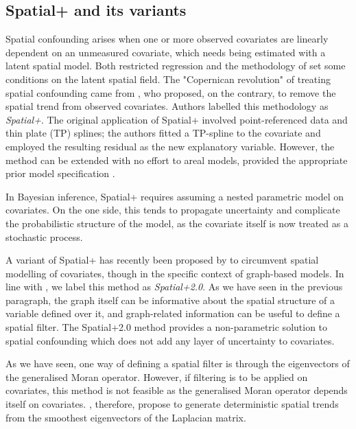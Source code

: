 \documentclass[openany, 11pt, oneside]{book}
\begin{document}




\subsection{Spatial+ and its variants} \label{subsection:Spatial+}

Spatial confounding arises when one or more observed covariates are linearly dependent on an unmeasured covariate, which needs being estimated with a latent spatial model. Both restricted regression and the methodology of \cite{HughesHaran} set some conditions on the latent spatial field. The "Copernican revolution" of treating spatial confounding came from \cite{Dupont}, who proposed, on the contrary, to remove the spatial trend from observed covariates. Authors labelled this methodology as \textit{Spatial+}. The original application of Spatial+ involved point-referenced data and thin plate (TP) splines; the authors fitted a TP-spline to the covariate and employed the resulting residual as the new explanatory variable. However, the method can be extended with no effort to areal models, provided the appropriate prior model specification \parencite{BayesianSpatial+}. 

In Bayesian inference, Spatial+ requires assuming a nested parametric model on covariates. On the one side, this tends to propagate uncertainty \parencite{BayesianSpatial+} and complicate the probabilistic structure of the model, as the covariate itself is now treated as a stochastic process. 

A variant of Spatial+ has recently been proposed by \cite{Urdangarin24} to circumvent spatial modelling of covariates, though in the specific context of graph-based models. In line with \parencite{Lamouroux}, we label this method as \textit{Spatial+2.0}. As we have seen in the previous paragraph, the graph itself can be informative about the spatial structure of a variable defined over it,   and graph-related information can be useful to define a spatial filter. The Spatial+2.0 method provides a non-parametric solution to spatial confounding which does not add any layer of uncertainty to covariates. 

As we have seen, one way of defining a spatial filter is through the eigenvectors of the generalised Moran operator. However, if filtering is to be applied on covariates, this method is not feasible as the generalised Moran operator depends itself on covariates. \cite{Urdangarin24}, therefore, propose to generate deterministic spatial trends from the smoothest eigenvectors of the Laplacian matrix.
\end{document}
